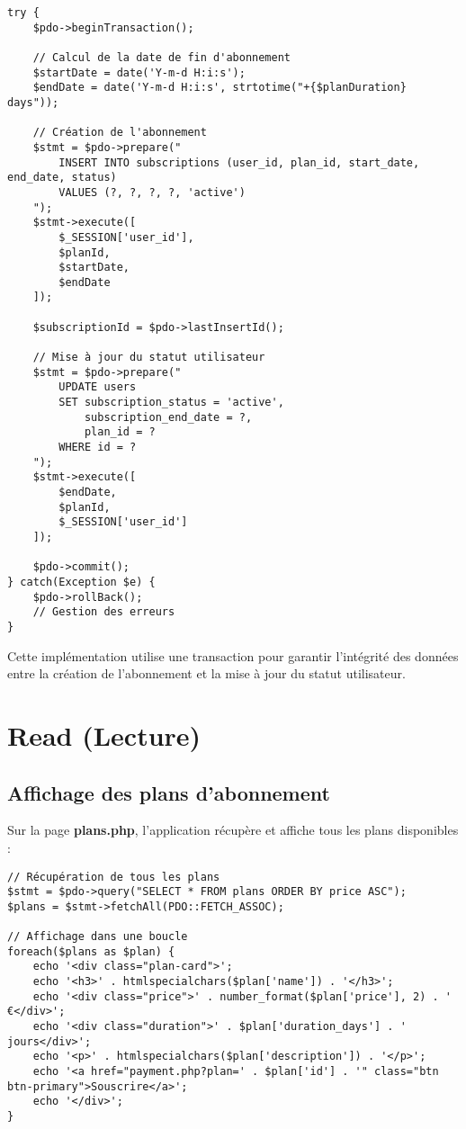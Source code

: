 \documentclass[12pt,a4paper]{report}
\begin{document}
\begin{lstlisting}[style=phpStyle, caption=Extrait de payment.php - Création d'un abonnement]
try {
    $pdo->beginTransaction();
    
    // Calcul de la date de fin d'abonnement
    $startDate = date('Y-m-d H:i:s');
    $endDate = date('Y-m-d H:i:s', strtotime("+{$planDuration} days"));
    
    // Création de l'abonnement
    $stmt = $pdo->prepare("
        INSERT INTO subscriptions (user_id, plan_id, start_date, end_date, status)
        VALUES (?, ?, ?, ?, 'active')
    ");
    $stmt->execute([
        $_SESSION['user_id'],
        $planId,
        $startDate,
        $endDate
    ]);
    
    $subscriptionId = $pdo->lastInsertId();
    
    // Mise à jour du statut utilisateur
    $stmt = $pdo->prepare("
        UPDATE users 
        SET subscription_status = 'active',
            subscription_end_date = ?,
            plan_id = ?
        WHERE id = ?
    ");
    $stmt->execute([
        $endDate,
        $planId,
        $_SESSION['user_id']
    ]);
    
    $pdo->commit();
} catch(Exception $e) {
    $pdo->rollBack();
    // Gestion des erreurs
}
\end{lstlisting}

Cette implémentation utilise une transaction pour garantir l'intégrité des données entre la création de l'abonnement et la mise à jour du statut utilisateur.

\section{Read (Lecture)}

\subsection{Affichage des plans d'abonnement}
Sur la page \textbf{plans.php}, l'application récupère et affiche tous les plans disponibles :

\begin{lstlisting}[style=phpStyle, caption=Extrait de plans.php - Lecture des plans]
// Récupération de tous les plans
$stmt = $pdo->query("SELECT * FROM plans ORDER BY price ASC");
$plans = $stmt->fetchAll(PDO::FETCH_ASSOC);

// Affichage dans une boucle
foreach($plans as $plan) {
    echo '<div class="plan-card">';
    echo '<h3>' . htmlspecialchars($plan['name']) . '</h3>';
    echo '<div class="price">' . number_format($plan['price'], 2) . ' €</div>';
    echo '<div class="duration">' . $plan['duration_days'] . ' jours</div>';
    echo '<p>' . htmlspecialchars($plan['description']) . '</p>';
    echo '<a href="payment.php?plan=' . $plan['id'] . '" class="btn btn-primary">Souscrire</a>';
    echo '</div>';
}
\end{lstlisting}
\end{document}
